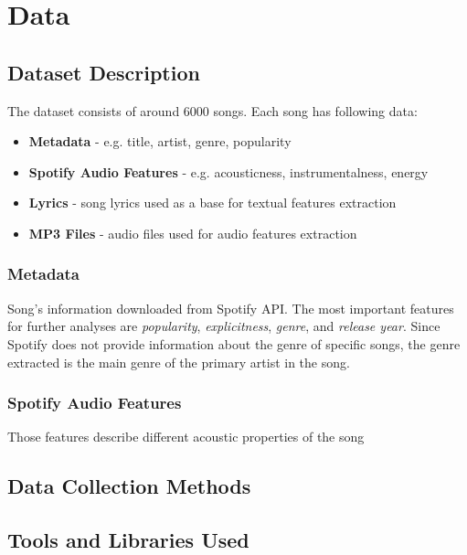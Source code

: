 \chapter{Data}
\label{cha:data}

\section{Dataset Description}
\label{sec:datasetdescription}

The dataset consists of around 6000 songs. Each song has following data:

\begin{itemize}
  \item \textbf{Metadata} -  e.g. title, artist, genre, popularity
  \item \textbf{Spotify Audio Features} - e.g. acousticness, instrumentalness,
    energy
  \item \textbf{Lyrics} - song lyrics used as a base for textual features
    extraction
  \item \textbf{MP3 Files} - audio files used for audio features extraction
\end{itemize}

\subsection{Metadata}
\label{sec:metadata}
Song's information downloaded from Spotify API. The most important features for
further analyses are \textit{popularity}, \textit{explicitness},
\textit{genre}, and \textit{release year}. Since Spotify does not provide
information about the genre of specific songs, the genre extracted is the main
genre of the primary artist in the song.


\subsection{Spotify Audio Features}
\label{sec:spotifyaudiofeatures}
Those features describe different acoustic properties of the song



\section{Data Collection Methods}
\label{sec:datacollectionmethods}


\section{Tools and Libraries Used}
\label{sec:toolsandlibrariesused}




